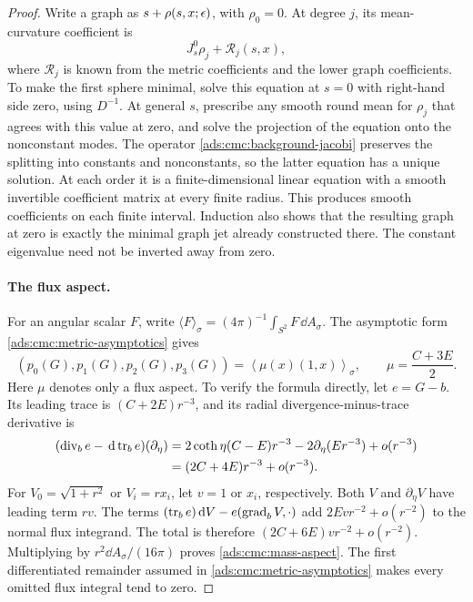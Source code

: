 \begin{proof}
Write a graph as \(s+\rho(s,x;\epsilon)\), with \(\rho_0=0\).
At degree \(j\), its mean-curvature coefficient is
\[
 J_s^0\rho_j+\mathcal R_j(s,x),
\]
where \(\mathcal R_j\) is known from the metric coefficients and the
lower graph coefficients.  To make the first sphere minimal, solve
this equation at \(s=0\) with right-hand side zero, using \(D^{-1}\).
At general \(s\), prescribe any smooth round mean for \(\rho_j\) that
agrees with this value at zero, and solve the projection of the
equation onto the nonconstant modes.
The operator \eqref{ads:cmc:background-jacobi} preserves the splitting
into constants and nonconstants, so the latter equation has a unique
solution.  At each order it is a finite-dimensional linear equation
with a smooth invertible coefficient matrix at every finite radius.
This produces smooth coefficients on each finite interval.
Induction also shows that the resulting graph at zero is exactly the
minimal graph jet already constructed there.
The constant eigenvalue need not be inverted away from zero.

\paragraph{The flux aspect.}
For an angular scalar \(F\), write
\(\langle F\rangle_\sigma=(4\pi)^{-1}\int_{S^2}F\,\dd A_\sigma\).
The asymptotic form \eqref{ads:cmc:metric-asymptotics} gives
\begin{equation}\label{ads:cmc:mass-aspect}
 (p_0(G),p_1(G),p_2(G),p_3(G))
 =\left\langle\mu(x)(1,x)\right\rangle_\sigma,
 \qquad \mu=\frac{C+3E}{2}.
\end{equation}
Here \(\mu\) denotes only a flux aspect.
To verify the formula directly, let \(e=G-b\).  Its leading trace is
\((C+2E)r^{-3}\), and its radial divergence-minus-trace derivative is
\begin{align*}
 (\operatorname{div}_b e-\,\mathrm d\operatorname{tr}_b e)(\partial_\eta)
 &=2\coth\eta(C-E)r^{-3}
       -2\partial_\eta(Er^{-3})+o(r^{-3})\\
 &=(2C+4E)r^{-3}+o(r^{-3}).
\end{align*}
For \(V_0=\sqrt{1+r^2}\) or \(V_i=rx_i\), let \(v=1\) or \(x_i\),
respectively.  Both \(V\) and \(\partial_\eta V\) have leading term
\(rv\).  The terms \((\operatorname{tr}_b e)\,\mathrm d V-e(\operatorname{grad}_bV,\cdot)\) add
\(2Ev r^{-2}+o(r^{-2})\) to the normal flux integrand.
The total is therefore
\((2C+6E)v r^{-2}+o(r^{-2})\).
Multiplying by \(r^2\dd A_\sigma/(16\pi)\) proves
\eqref{ads:cmc:mass-aspect}.  The first differentiated remainder assumed
in \eqref{ads:cmc:metric-asymptotics} makes every omitted flux integral
tend to zero.


\end{proof}
